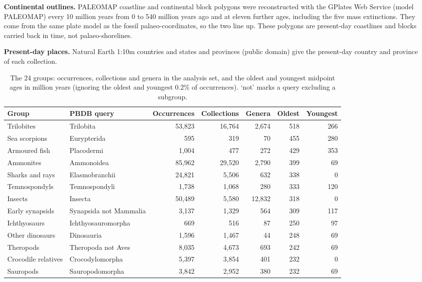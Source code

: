 \documentclass[11pt,a4paper]{article}
\begin{document}
\textbf{Continental outlines.} PALEOMAP coastline and continental block polygons \citep{scotese2016,scotese2018} were reconstructed with the GPlates Web Service (model PALEOMAP) every 10 million years from 0 to 540 million years ago and at eleven further ages, including the five mass extinctions. They come from the same plate model as the fossil palaeo-coordinates, so the two line up. These polygons are present-day coastlines and blocks carried back in time, not palaeo-shorelines.

\textbf{Present-day places.} Natural Earth 1:10m countries and states and provinces (public domain) give the present-day country and province of each collection.

\begin{table}[tbp]\centering\footnotesize\caption{The 24 groups: occurrences, collections and genera in the analysis set, and the oldest and youngest midpoint ages in million years (ignoring the oldest and youngest 0.2\% of occurrences). `not' marks a query excluding a subgroup.}\label{tab:groups}\setlength{\tabcolsep}{4pt}\begin{tabular}{llrrrrr}\toprule Group & PBDB query & Occurrences & Collections & Genera & Oldest & Youngest\\\midrule
Trilobites & Trilobita & 53,823 & 16,764 & 2,674 & 518 & 266\\
Sea scorpions & Eurypterida & 595 & 319 & 70 & 455 & 280\\
Armoured fish & Placodermi & 1,004 & 477 & 272 & 429 & 353\\
Ammonites & Ammonoidea & 85,962 & 29,520 & 2,790 & 399 & 69\\
Sharks and rays & Elasmobranchii & 24,821 & 5,506 & 632 & 338 & 0\\
Temnospondyls & Temnospondyli & 1,738 & 1,068 & 280 & 333 & 120\\
Insects & Insecta & 50,489 & 5,580 & 12,832 & 318 & 0\\
Early synapsids & Synapsida not Mammalia & 3,137 & 1,329 & 564 & 309 & 117\\
Ichthyosaurs & Ichthyosauromorpha & 669 & 516 & 87 & 250 & 97\\
Other dinosaurs & Dinosauria & 1,596 & 1,467 & 44 & 248 & 69\\
Theropods & Theropoda not Aves & 8,035 & 4,673 & 693 & 242 & 69\\
Crocodile relatives & Crocodylomorpha & 5,397 & 3,854 & 401 & 232 & 0\\
Sauropods & Sauropodomorpha & 3,842 & 2,952 & 380 & 232 & 69\\

\end{tabular}
\end{table}
\end{document}
